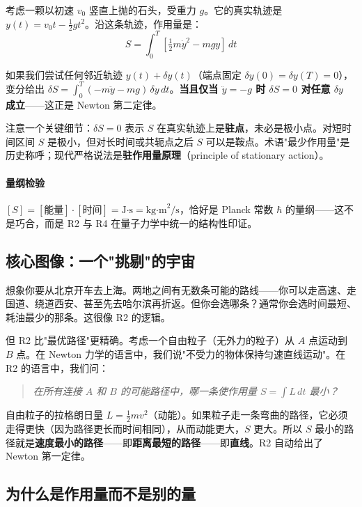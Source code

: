 考虑一颗以初速 $v_0$ 竖直上抛的石头，受重力 $g$。它的真实轨迹是 $y(t) = v_0 t - \tfrac{1}{2}g t^2$。沿这条轨迹，作用量是：
\[
S = \int_0^T \left[ \tfrac{1}{2}m\dot{y}^2 - mgy \right]\,dt
\]

如果我们尝试任何邻近轨迹 $y(t) + \delta y(t)$（端点固定 $\delta y(0)=\delta y(T)=0$），变分给出 $\delta S = \int_0^T (-m\ddot{y} - mg)\,\delta y\,dt$。\textbf{当且仅当 $\ddot{y} = -g$ 时 $\delta S = 0$ 对任意 $\delta y$ 成立}——这正是 Newton 第二定律。

注意一个关键细节：$\delta S = 0$ 表示 $S$ 在真实轨迹上是\textbf{驻点}，未必是极小点。对短时间区间 $S$ 是极小，但对长时间或共轭点之后 $S$ 可以是鞍点。术语"最少作用量"是历史称呼；现代严格说法是\textbf{驻作用量原理}（principle of stationary action）。

\paragraph{量纲检验} $[S] = [\text{能量}] \cdot [\text{时间}] = \text{J·s} = \text{kg·m}^2/\text{s}$，恰好是 Planck 常数 $\hbar$ 的量纲——这不是巧合，而是 R2 与 R4 在量子力学中统一的结构性印证。

\subsection{核心图像：一个"挑剔"的宇宙}

想象你要从北京开车去上海。两地之间有无数条可能的路线——你可以走高速、走国道、绕道西安、甚至先去哈尔滨再折返。但你会选哪条？通常你会选时间最短、耗油最少的那条。这很像 R2 的逻辑。

但 R2 比"最优路径"更精确。考虑一个自由粒子（无外力的粒子）从 $A$ 点运动到 $B$ 点。在 Newton 力学的语言中，我们说"不受力的物体保持匀速直线运动"。在 R2 的语言中，我们问：

\begin{quote}
\textit{在所有连接 $A$ 和 $B$ 的可能路径中，哪一条使作用量 $S = \int L\,dt$ 最小？}
\end{quote}

自由粒子的拉格朗日量 $L = \frac{1}{2}m v^2$（动能）。如果粒子走一条弯曲的路径，它必须走得更快（因为路径更长而时间相同），从而动能更大，$S$ 更大。所以 $S$ 最小的路径就是\textbf{速度最小的路径}——即\textbf{距离最短的路径}——即\textbf{直线}。R2 自动给出了 Newton 第一定律。

\subsection{为什么是作用量而不是别的量}

